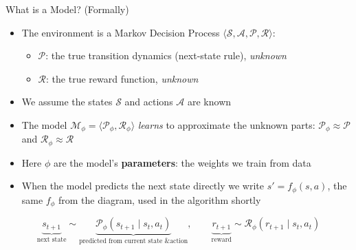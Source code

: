 \begin{frame}{What is a Model? (Formally)}
\begin{itemize}
    \item The environment is a Markov Decision Process
          $\langle \mathcal{S}, \mathcal{A}, \mathcal{P}, \mathcal{R} \rangle$:
    \begin{itemize}
        \item $\mathcal{P}$: the true transition dynamics (next-state rule),
              \emph{unknown}
        \item $\mathcal{R}$: the true reward function, \emph{unknown}
    \end{itemize}
    \item We assume the states $\mathcal{S}$ and actions $\mathcal{A}$ are known
    \item The model $\mathcal{M}_\phi = \langle \mathcal{P}_\phi, \mathcal{R}_\phi \rangle$
          \emph{learns} to approximate the unknown parts:
          $\mathcal{P}_\phi \approx \mathcal{P}$ and $\mathcal{R}_\phi \approx \mathcal{R}$
    \item Here $\phi$ are the model's \textbf{parameters}: the weights we train
          from data
    \item When the model predicts the next state directly we write
          $s' = f_\phi(s, a)$, the same $f_\phi$ from the diagram, used in the
          algorithm shortly
\end{itemize}
\[
    \underbrace{s_{t+1}}_{\text{next state}} \sim
    \underbrace{\mathcal{P}_\phi(s_{t+1} \mid s_t, a_t)}_{\text{predicted from current state \& action}},
    \qquad
    \underbrace{r_{t+1}}_{\text{reward}} \sim
    \mathcal{R}_\phi(r_{t+1} \mid s_t, a_t)
\]
\end{frame}

